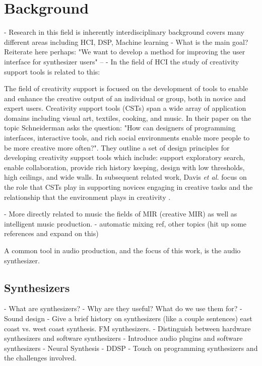 \chapter{Background}
\label{chapter:background}
- Research in this field is inherently interdisciplinary background covers many different areas including HCI, DSP, Machine learning
- What is the main goal? Reiterate here perhaps: "We want to develop a method for improving the user interface for synthesizer users" -- 
- In the field of HCI the study of creativity support tools is related to this:

The field of creativity support is focused on the development of tools to enable and enhance the creative output of an individual or group, both in novice and expert users. Creativity support tools (CSTs) \cite{shneiderman2007creativity} span a wide array of application domains including visual art, textiles, cooking, and music. In their paper on the topic Schneiderman asks the question: "How can designers of programming interfaces, interactive tools, and rich social environments enable more people to be more creative more often?". They outline a set of design principles for developing creativity support tools which include: support exploratory search, enable collaboration, provide rich history keeping, design with low thresholds, high ceilings, and wide walls. In subsequent related work, Davis \textit{et al.} focus on the role that CSTs play in supporting novices engaging in creative tasks and the relationship that the environment plays in creativity \cite{davis2013toward}.

- More directly related to music the fields of MIR (creative MIR) as well as intelligent music production. - automatic mixing ref, other topics (hit up some references and expand on this)

A common tool in audio production, and the focus of this work, is the audio synthesizer.

\section{Synthesizers}
- What are synthesizers?
- Why are they useful? What do we use them for?
- Sound design
- Give a brief history on synthesizers (like a couple sentences) east coast vs. west coast synthesis. FM synthesizers.
- Distinguish between hardware synthesizers and software synthesizers
- Introduce audio plugins and software synthesizers
- Neural Synthesis
- DDSP
- Touch on programming synthesizers and the challenges involved.

